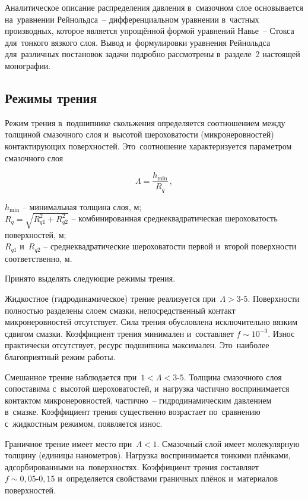 Аналитическое описание распределения давления в~смазочном слое основывается на~уравнении Рейнольдса~-- дифференциальном уравнении в~частных производных, которое является упрощённой формой уравнений Навье~-- Стокса для~тонкого вязкого слоя. Вывод и~формулировки уравнения Рейнольдса для~различных постановок задачи подробно рассмотрены в~разделе~2 настоящей монографии.

\subsection{Режимы трения}

Режим трения в~подшипнике скольжения определяется соотношением между толщиной смазочного слоя и~высотой шероховатости (микронеровностей) контактирующих поверхностей. Это~соотношение характеризуется параметром смазочного слоя

\begin{equation}
\Lambda = \frac{h_{\min}}{R_q}\,,
\end{equation}
\begin{conditions}
$h_{\min}$ -- минимальная толщина слоя, м;\\
$R_q = \sqrt{R_{q1}^2 + R_{q2}^2}$ -- комбинированная среднеквадратическая шероховатость поверхностей, м;\\
$R_{q1}$ и~$R_{q2}$ -- среднеквадратические шероховатости первой и~второй поверхности соответственно, м.
\end{conditions}
Принято выделять следующие режимы трения.

Жидкостное (гидродинамическое) трение реализуется при~$\Lambda > 3\text{-}5$. Поверхности полностью разделены слоем смазки, непосредственный контакт микронеровностей отсутствует. Сила трения обусловлена исключительно вязким сдвигом смазки. Коэффициент трения минимален и~составляет $f \sim 10^{-3}$. Износ практически отсутствует, ресурс подшипника максимален. Это~наиболее благоприятный режим работы.

Смешанное трение наблюдается при~$1 < \Lambda < 3\text{-}5$. Толщина смазочного слоя сопоставима с~высотой шероховатостей, и~нагрузка частично воспринимается контактом микронеровностей, частично~-- гидродинамическим давлением в~смазке. Коэффициент трения существенно возрастает по~сравнению с~жидкостным режимом, появляется износ.

Граничное трение имеет место при~$\Lambda < 1$. Смазочный слой имеет молекулярную толщину (единицы нанометров). Нагрузка воспринимается тонкими плёнками, адсорбированными на~поверхностях. Коэффициент трения составляет $f \sim 0{,}05\text{-}0{,}15$ и~определяется свойствами граничных плёнок и~материалов поверхностей.

